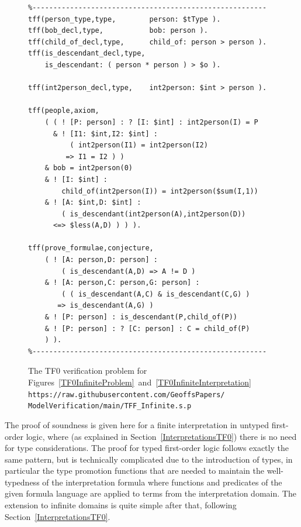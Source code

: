 \documentclass[letterpaper]{article}
\begin{document}
\begin{figure}[htbp]
\scriptsize
{}
\begin{verbatim}
%--------------------------------------------------------
tff(person_type,type,        person: $tType ).
tff(bob_decl,type,           bob: person ).
tff(child_of_decl,type,      child_of: person > person ).
tff(is_descendant_decl,type, 
    is_descendant: ( person * person ) > $o ).

tff(int2person_decl,type,    int2person: $int > person ).

tff(people,axiom,
    ( ( ! [P: person] : ? [I: $int] : int2person(I) = P
      & ! [I1: $int,I2: $int] : 
          ( int2person(I1) = int2person(I2) 
         => I1 = I2 ) )
    & bob = int2person(0)
    & ! [I: $int] : 
        child_of(int2person(I)) = int2person($sum(I,1))
    & ! [A: $int,D: $int] : 
        ( is_descendant(int2person(A),int2person(D)) 
      <=> $less(A,D) ) ) ).

tff(prove_formulae,conjecture,
    ( ! [A: person,D: person] : 
        ( is_descendant(A,D) => A != D )
    & ! [A: person,C: person,G: person] :
        ( ( is_descendant(A,C) & is_descendant(C,G) )
       => is_descendant(A,G) )
    & ! [P: person] : is_descendant(P,child_of(P))
    & ! [P: person] : ? [C: person] : C = child_of(P) 
    ) ).
%--------------------------------------------------------
\end{verbatim}
\caption{The TF0 verification problem for 
Figures~\ref{TF0InfiniteProblem}~and~\ref{TF0InfiniteInterpretation}\\
{\scriptsize {\tt https://raw.githubusercontent.com/GeoffsPapers/\\
ModelVerification/main/TFF\_Infinite.s.p}}}
\label{TF0InfiniteVerification}
\end{figure}

The proof of soundness is given here for a finite interpretation in untyped first-order logic, 
where (as explained in Section~\ref{InterpretationsTF0}) there is no need for type considerations.
The proof for typed first-order logic follows exactly the same pattern, but is technically
complicated due to the introduction of types, in particular the type promotion functions that are 
needed to maintain the well-typedness of the interpretation formula where functions and 
predicates of the given formula language are applied to terms from the interpretation domain.
The extension to infinite domains is quite simple after that, following 
Section~\ref{InterpretationsTF0}.
\end{document}
